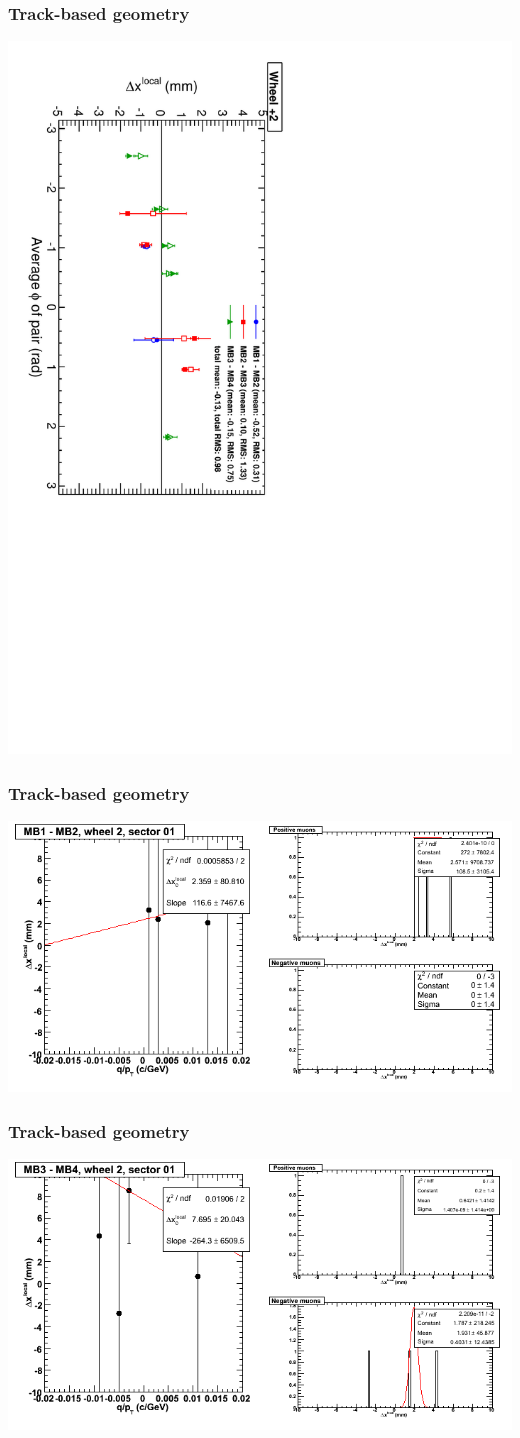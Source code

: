 \documentclass[compress]{beamer}
\begin{document}
\begin{frame}
\frametitle{Track-based geometry}
\includegraphics[height=\linewidth, angle=90]{NOV4_segdiff_x_whp2.pdf}
\end{frame}

\begin{frame}
\frametitle{Track-based geometry}
\includegraphics[width=\linewidth]{NOV4_segdiffs/dt13_resid_E_01_12.png}
\end{frame}

\begin{frame}
\frametitle{Track-based geometry}
\includegraphics[width=\linewidth]{NOV4_segdiffs/dt13_resid_E_01_34.png}
\end{frame}
\end{document}

